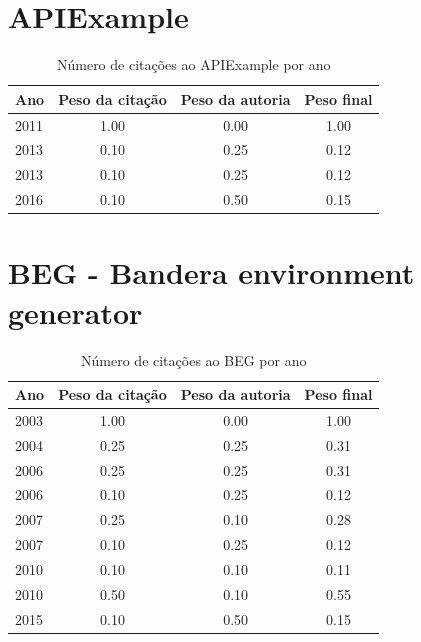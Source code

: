 \section{APIExample}
\begin{table}[H]
\caption{Número de citações ao APIExample por ano}
\centering
\begin{tabular}{| l | c | c | c |}
  \hline
  Ano & Peso da citação & Peso da autoria & Peso final \\
  \hline
  2011
    & 1.00
    & 0.00
    & {\color{blue} 1.00} \\
\hline
  2013
    & 0.10
    & 0.25
    & {\color{red} 0.12} \\
  2013
    & 0.10
    & 0.25
    & {\color{red} 0.12} \\
\hline
  2016
    & 0.10
    & 0.50
    & {\color{red} 0.15} \\
\hline
\end{tabular}
\end{table}
\section{BEG - Bandera environment generator}
\begin{table}[H]
\caption{Número de citações ao BEG  por ano}
\centering
\begin{tabular}{| l | c | c | c |}
  \hline
  Ano & Peso da citação & Peso da autoria & Peso final \\
  \hline
  2003
    & 1.00
    & 0.00
    & {\color{blue} 1.00} \\
\hline
  2004
    & 0.25
    & 0.25
    & {\color{red} 0.31} \\
\hline
  2006
    & 0.25
    & 0.25
    & {\color{red} 0.31} \\
  2006
    & 0.10
    & 0.25
    & {\color{red} 0.12} \\
\hline
  2007
    & 0.25
    & 0.10
    & {\color{red} 0.28} \\
  2007
    & 0.10
    & 0.25
    & {\color{red} 0.12} \\
\hline
  2010
    & 0.10
    & 0.10
    & {\color{red} 0.11} \\
  2010
    & 0.50
    & 0.10
    & {\color{blue} 0.55} \\
\hline
  2015
    & 0.10
    & 0.50
    & {\color{red} 0.15} \\
\hline
\end{tabular}
\end{table}

